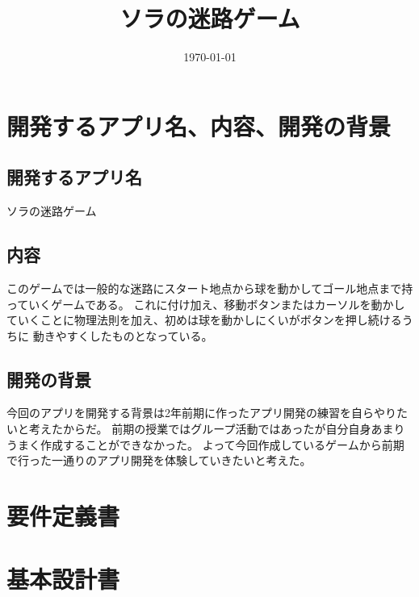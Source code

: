 \documentclass[a4paper, 11pt, titlepage]{jsarticle}
\title{ソラの迷路ゲーム}
\date{\today }
\begin{document}
\maketitle
\tableofcontents

\clearpage

\section{開発するアプリ名、内容、開発の背景}
\subsection*{開発するアプリ名}
ソラの迷路ゲーム

\subsection*{内容}
このゲームでは一般的な迷路にスタート地点から球を動かしてゴール地点まで持っていくゲームである。
これに付け加え、移動ボタンまたはカーソルを動かしていくことに物理法則を加え、初めは球を動かしにくいがボタンを押し続けるうちに
動きやすくしたものとなっている。

\subsection*{開発の背景}
今回のアプリを開発する背景は2年前期に作ったアプリ開発の練習を自らやりたいと考えたからだ。
前期の授業ではグループ活動ではあったが自分自身あまりうまく作成することができなかった。
よって今回作成しているゲームから前期で行った一通りのアプリ開発を体験していきたいと考えた。
\clearpage

\section{要件定義書}
\clearpage

\section{基本設計書}
\end{document}
